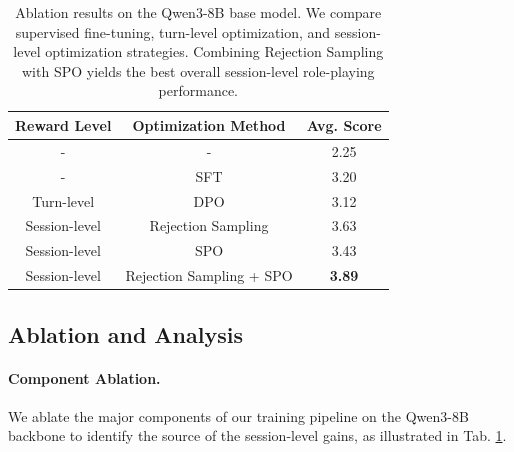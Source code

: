 \begin{table}[t]
\centering
\small
\caption{Ablation results on the Qwen3-8B base model. We compare supervised fine-tuning, turn-level optimization, and session-level optimization strategies. Combining Rejection Sampling with SPO yields the best overall session-level role-playing performance.}
\label{tab:model_ablation}
\begin{tabular}{ccc}
\toprule
Reward Level & Optimization Method & Avg. Score \\
\midrule
-          & -                        & 2.25 \\
-         & SFT                         & 3.20 \\
Turn-level    & DPO                         & 3.12 \\
Session-level & Rejection Sampling          & 3.63 \\
Session-level & SPO                         & 3.43 \\
Session-level & Rejection Sampling + SPO    & \textbf{3.89} \\
\bottomrule
\end{tabular}
\end{table}

\subsection{Ablation and Analysis}


\paragraph{Component Ablation.}



We ablate the major components of our training pipeline on the Qwen3-8B backbone to identify the source of the session-level gains, as illustrated in Tab. \ref{tab:model_ablation}. 

